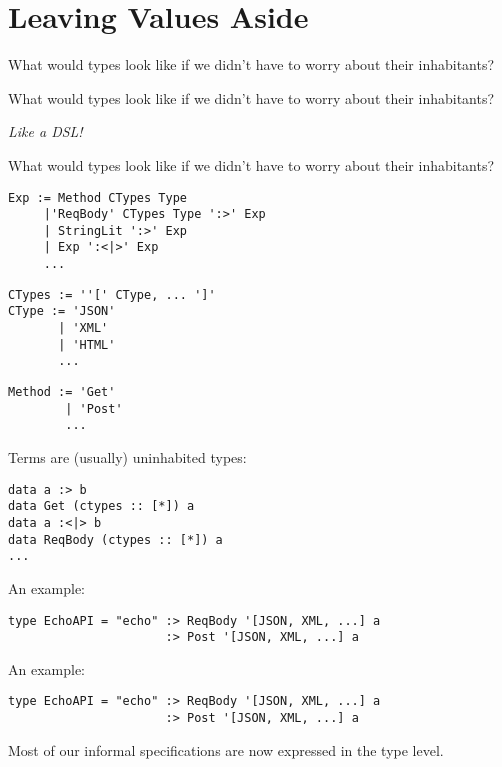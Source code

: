 \documentclass{beamer}
\begin{document}
\section{Leaving Values Aside}%

\begin{frame}
    What would types look like if we didn't have to worry about their
    inhabitants?
\end{frame}

\begin{frame}
    What would types look like if we didn't have to worry about their
    inhabitants?

    \textit{Like a DSL!}
\end{frame}

\begin{frame}[fragile]
    What would types look like if we didn't have to worry about their
    inhabitants?

\begin{verbatim}
Exp := Method CTypes Type
     |'ReqBody' CTypes Type ':>' Exp
     | StringLit ':>' Exp
     | Exp ':<|>' Exp
     ...
\end{verbatim}

\begin{verbatim}
CTypes := ''[' CType, ... ']'
CType := 'JSON'
       | 'XML'
       | 'HTML'
       ...
\end{verbatim}

\begin{verbatim}
Method := 'Get'
        | 'Post'
        ...
\end{verbatim}
\end{frame}

\begin{frame}[fragile]
Terms are (usually) uninhabited types:
    \begin{verbatim}
data a :> b
data Get (ctypes :: [*]) a
data a :<|> b
data ReqBody (ctypes :: [*]) a
...
    \end{verbatim}
\end{frame}

\begin{frame}[fragile]
An example:
\begin{verbatim}
type EchoAPI = "echo" :> ReqBody '[JSON, XML, ...] a
                      :> Post '[JSON, XML, ...] a
\end{verbatim}
\end{frame}

\begin{frame}[fragile]
An example:
\begin{verbatim}
type EchoAPI = "echo" :> ReqBody '[JSON, XML, ...] a
                      :> Post '[JSON, XML, ...] a
\end{verbatim}
Most of our informal specifications are now expressed in the type level.
\end{frame}
\end{document}
